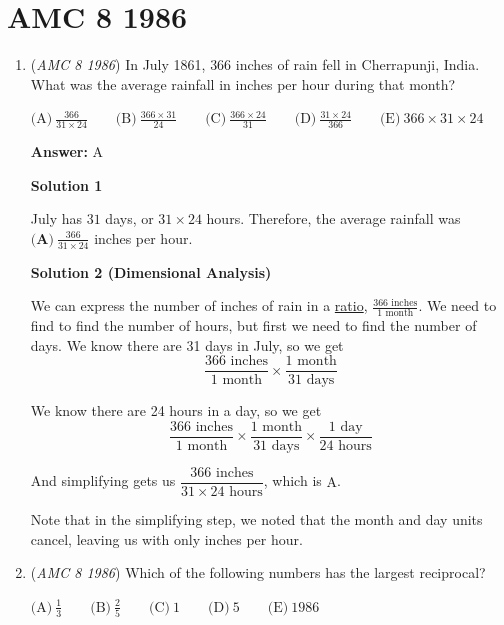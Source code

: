 \section{AMC 8 1986}
        \begin{enumerate}
        	\item (\textit{AMC 8 1986}) In July 1861, $366$ inches of rain fell in Cherrapunji, India.  What was the average rainfall in inches per hour during that month?


 $\text{(A)}\ \frac{366}{31\times 24} \qquad \text{(B)}\ \frac{366\times 31}{24}\qquad \text{(C)}\ \frac{366\times 24}{31}\qquad \text{(D)}\ \frac{31\times 24}{366}\qquad \text{(E)}\  366\times 31\times 24$

 \textbf{Answer: }A



\textbf{Solution 1}

July has $31$ days, or $31 \times 24$ hours.  Therefore, the average rainfall was $\boxed{\textbf{(A)}\ \frac{366}{31 \times 24}}$ inches per hour.

 



\textbf{Solution 2 (Dimensional Analysis)}

We can express the number of inches of rain in a \href{https://artofproblemsolving.com/wiki/index.php?title=Ratio}{ratio}, $\frac{366 \text{ inches}}{1\text{  month}}$. We need to find to find the number of hours, but first we need to find the number of days. We know there are 31 days in July, so we get 
 \[\frac{366 \text{ inches}}{1 \text{ month}} \times \frac{1 \text{ month}}{31 \text{ days}}\]

 We know there are 24 hours in a day, so we get 
 \[\frac{366 \text{ inches}}{1 \text{ month}} \times \frac{1 \text{ month}}{31 \text{ days}} \times \frac{1 \text{ day}}{24 \text{ hours}}\]

 And simplifying gets us $\dfrac{366 \text{ inches}}{31 \times 24 \text{ hours}}$, which is $\boxed{\text{A}}$.

 Note that in the simplifying step, we noted that the month and day units cancel, leaving us with only inches per hour.

 


	\item (\textit{AMC 8 1986}) Which of the following numbers has the largest reciprocal?


 $\text{(A)}\ \frac{1}{3} \qquad \text{(B)}\ \frac{2}{5} \qquad \text{(C)}\ 1 \qquad \text{(D)}\ 5 \qquad \text{(E)}\ 1986$


\end{enumerate}
